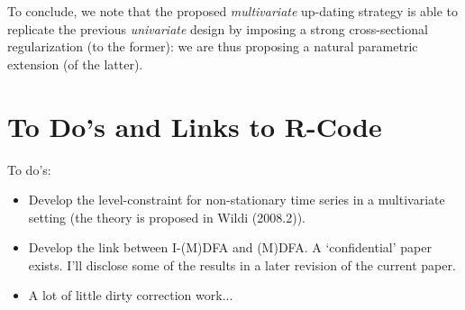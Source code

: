 \documentclass[11pt]{article}
\begin{document}
To conclude, we note that the proposed \emph{multivariate} up-dating strategy is able to replicate the previous \emph{univariate} design by imposing a strong cross-sectional regularization (to the former): we are thus proposing a natural parametric extension (of the latter). 


\section{To Do's and Links to R-Code}

To do's:
\begin{itemize}
\item Develop the level-constraint for non-stationary time series in a multivariate setting (the theory is  proposed in Wildi (2008.2)). 
\item Develop the link between I-(M)DFA and (M)DFA. A `confidential' paper exists. I'll disclose some of the results in a later revision of the current paper.
\item A lot of little dirty correction work...
\end{itemize}
\end{document}
